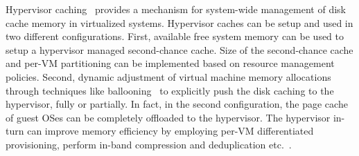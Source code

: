 %
%
Hypervisor caching~\cite{memtrans, oracletmem, kvmzcache, vmmexclusive, singleton} 
provides a mechanism for system-wide management of %
disk cache memory in virtualized systems. 
%
Hypervisor caches can be setup and used 
in two different configurations.
%
First, available free system memory can be used to setup a 
hypervisor managed second-chance cache.
%
Size of the second-chance cache and per-VM partitioning 
can be implemented based on resource management policies.
%
Second, dynamic adjustment of virtual machine memory allocations through
techniques like ballooning~\cite{vmware,hotplug} to explicitly
push the disk caching to the hypervisor, fully or partially.
%
In fact, in the second configuration, the page cache of guest OSes
can be completely offloaded to the hypervisor. 
%
The hypervisor in-turn can improve
memory efficiency by employing per-VM differentiated provisioning,
perform in-band compression and deduplication etc.~\cite{oracletmem,kvmzcache}.
%

